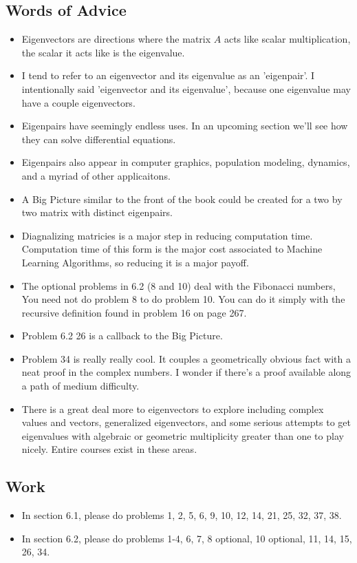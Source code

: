 	\subsection{Words of Advice}
		\begin{itemize}
			\item Eigenvectors are directions where the matrix $A$ acts like scalar multiplication, the scalar it acts like is the eigenvalue.
			\item I tend to refer to an eigenvector and its eigenvalue as an 'eigenpair'. I intentionally said 'eigenvector and its eigenvalue', because one eigenvalue may have a couple eigenvectors.
			\item Eigenpairs have seemingly endless uses. In an upcoming section we'll see how they can solve differential equations.
			\item Eigenpairs also appear in computer graphics, population modeling, dynamics, and a myriad of other applicaitons.
			\item A Big Picture similar to the front of the book could be created for a two by two matrix with distinct eigenpairs.
			\item Diagnalizing matricies is a major step in reducing computation time. Computation time of this form is the major cost associated to Machine Learning Algorithms, so reducing it is a major payoff.
			\item The optional problems in 6.2 (8 and 10) deal with the Fibonacci numbers, You need not do problem 8 to do problem 10. You can do it simply with the recursive definition found in problem 16 on page 267.
			\item Problem 6.2 26 is a callback to the Big Picture.
			\item Problem 34 is really really cool. It couples a geometrically obvious fact with a neat proof in the complex numbers. I wonder if there's a proof available along a path of medium difficulty.
			\item There is a great deal more to eigenvectors to explore including complex values and vectors, generalized eigenvectors, and some serious attempts to get eigenvalues with algebraic or geometric multiplicity greater than one to play nicely. Entire courses exist in these areas.
		\end{itemize}

	\subsection{Work}
		\begin{itemize}
			\item In section 6.1, please do problems 1, 2, 5, 6, 9, 10, 12, 14, 21, 25, 32, 37, 38.
			\item In section 6.2, please do problems 1-4, 6, 7, 8 optional, 10 optional, 11, 14, 15, 26, 34.
		\end{itemize}

